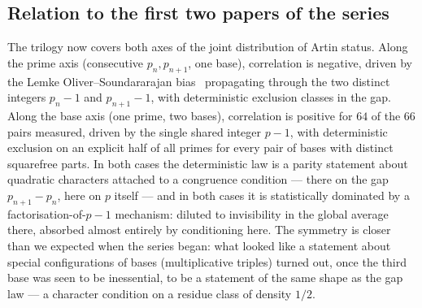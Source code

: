 \documentclass[11pt,reqno]{amsart}
\theoremstyle{plain}
\theoremstyle{definition}
\begin{document}
\subsection*{Relation to the first two papers of the series~\cite{BaldI, BaldII}}
The trilogy now covers both axes of the joint distribution of Artin status.
Along the prime axis (consecutive $p_n, p_{n+1}$, one base), correlation is
negative, driven by the Lemke Oliver--Soundararajan bias~\cite{LOS2016}
propagating through the two distinct integers $p_n - 1$ and $p_{n+1} - 1$,
with deterministic exclusion classes in the gap. Along the base axis (one prime, two bases), correlation is positive for $64$ of the $66$ pairs measured, driven by the single shared integer $p - 1$, with deterministic exclusion on an explicit half of all primes for every pair of bases with distinct squarefree parts.
In both cases the deterministic law is a parity statement about quadratic
characters attached to a congruence condition --- there on the gap
$p_{n+1} - p_n$, here on $p$ itself --- and in both cases it is statistically
dominated by a factorisation-of-$p-1$ mechanism: diluted to invisibility in
the global average there, absorbed almost entirely by conditioning here. The
symmetry is closer than we expected when the series began: what looked like a
statement about special configurations of bases (multiplicative triples) turned
out, once the third base was seen to be inessential, to be a statement of the
same shape as the gap law --- a character condition on a residue class of
density $1/2$.
\end{document}
